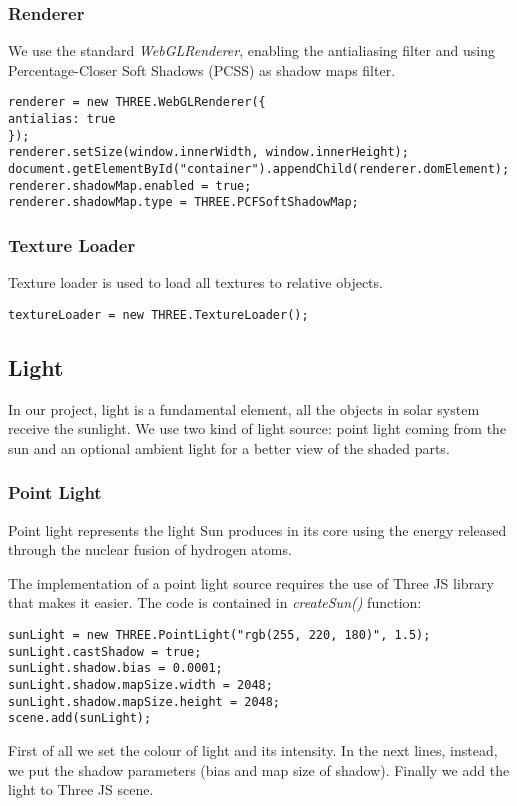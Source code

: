 \documentclass{article}
\begin{document}
\subsubsection{Renderer}
We use the standard \textit{WebGLRenderer}\cite{documentation:threejs}, enabling the antialiasing filter and using Percentage-Closer Soft Shadows (PCSS) as shadow maps filter\cite{PCSS:nvidia}.
\begin{lstlisting}
renderer = new THREE.WebGLRenderer({
antialias: true
});
renderer.setSize(window.innerWidth, window.innerHeight);
document.getElementById("container").appendChild(renderer.domElement);
renderer.shadowMap.enabled = true;
renderer.shadowMap.type = THREE.PCFSoftShadowMap;
\end{lstlisting}
\subsubsection{Texture Loader}
Texture loader\cite{documentation:threejs} is used to load all textures to relative objects.
\begin{lstlisting}
textureLoader = new THREE.TextureLoader();
\end{lstlisting}

\subsection{Light}
In our project, light is a fundamental element, all the objects in solar system receive the sunlight. We use two kind of light source: point light coming from the sun and an optional ambient light for a better view of the shaded parts.
\subsubsection{Point Light}\label{subsec:pointlight}
Point light represents the light Sun produces in its core using the energy released through the nuclear fusion of hydrogen atoms\cite{solarcore:wikipedia}.
\par The implementation of a point light source requires the use of Three JS library that makes it easier\cite{documentation:threejs}. The code is contained in \textit{createSun()} function:
\begin{lstlisting}
sunLight = new THREE.PointLight("rgb(255, 220, 180)", 1.5);
sunLight.castShadow = true;
sunLight.shadow.bias = 0.0001;
sunLight.shadow.mapSize.width = 2048;
sunLight.shadow.mapSize.height = 2048;
scene.add(sunLight);
\end{lstlisting}
First of all we set the colour of light and its intensity. In the next lines, instead, we put the shadow parameters (bias and map size of shadow). Finally we add the light to Three JS scene.
\end{document}

